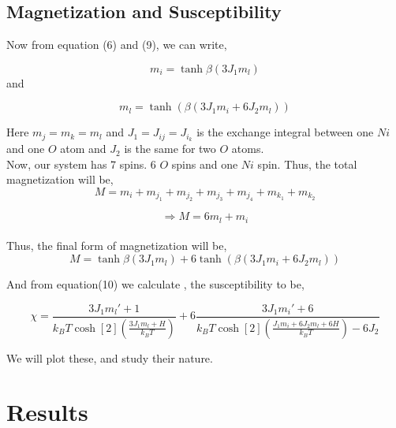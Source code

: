 \documentclass[24pt]{article}
\begin{document}
\subsection{{\large \textbf{Magnetization and Susceptibility}}}
\begin{large}


Now from equation (6) and (9), we can write,

\begin{equation}
m_i = \tanh{\beta (3 J_1 m_l)}
\end{equation}
and

\begin{equation}
m_l = \tanh(\beta (3 J_1 m_i + 6 J_2 m_l))
\end{equation}

Here $m_j = m_k = m_l$ and
 $J_1 = J_{ij}=J_{i_k}$ is the exchange integral between one $Ni$ and one $O$ atom and 
 $J_2$ is the same for two $O$ atoms.\\
 
 Now, our system has 7 spins. 6 $O$ spins and one $Ni$ spin. Thus, the total magnetization will be,\\
 $$M = m_i+ m_{j_1} + m_{j_2}+ m_{j_3}+ m_{j_4}+ m_{k_1}+ m_{k_2} $$
 
\begin{equation}
\Rightarrow M = 6 m_l + m_i
\end{equation}
\\Thus, the final form of magnetization will be,\\
\begin{equation}
M = \tanh{\beta (3 J_1 m_l)} + 6 \tanh(\beta (3 J_1 m_i + 6 J_2 m_l))
\end{equation}

And from equation(10) we calculate , the susceptibility to be,

\begin{equation}
\chi = \frac{3 J_1 m_l ' + 1}{k_B T \cosh[2](\frac{3J_1 m_l + H}{k_B T})}+ 6 \frac{3 J_1 m_i '+ 6}{k_B T \cosh[2](\frac{J _1 m_i + 6 J_2 m_l + 6 H} {k_B T })- 6 J_2}
\end{equation}

We will plot these, and study their nature.\\
\end{large}

\section{{\Large Results}}
\end{document}

